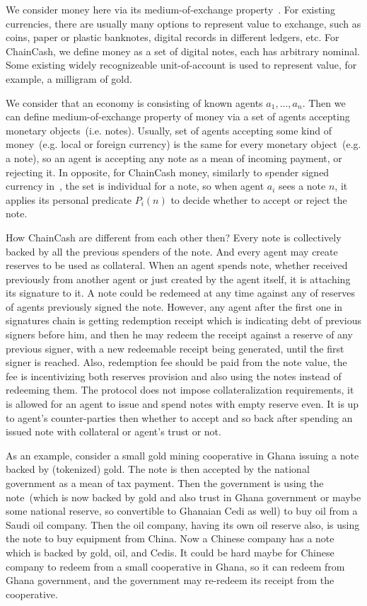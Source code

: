 \documentclass{llncs}   %
\newcommand{\cc}{ChainCash}
\begin{document}
We consider money here via its medium-of-exchange property~\cite{kiyotaki1989money}. For existing currencies, there are usually many options to represent value to exchange, such as coins, paper or plastic banknotes, digital records in different ledgers, etc. For \cc{}, we define money as a set of digital notes, each has arbitrary nominal. Some existing widely recognizeable unit-of-account is used to represent value, for example, a milligram of gold.

We consider that an economy is consisting of known agents $a_1, ..., a_n$. Then we can define medium-of-exchange property of money via a set of agents accepting monetary objects~(i.e. notes). Usually, set of agents accepting some kind of money~(e.g. local or foreign currency) is the same for every monetary object~(e.g. a note), so an agent is accepting any note as a mean of incoming payment, or rejecting it. In opposite, for \cc{} money, similarly to spender signed currency in~\cite{saito2003peer}, the set is individual for a note, so when agent $a_i$ sees a note $n$, it applies its personal predicate $P_i(n)$ to decide whether to accept or reject the note.

How \cc{} are different from each other then? Every note is collectively backed by all the previous spenders of the note. And every agent may create reserves to be used as collateral. When an agent spends note, whether received previously from another agent or just created by the agent itself, it is attaching its signature to it. A note could be redemeed at any time against any of reserves of agents previously signed the note. However, any agent after the first one in signatures chain is getting redemption receipt which is indicating debt of previous signers before him, and then he may redeem the receipt against a reserve of any previous signer, with a new redeemable receipt being generated, until the first signer is reached. Also, redemption fee should be paid from the note value, the fee is incentivizing both reserves provision and also using the notes instead of redeeming them. The protocol does not impose collateralization requirements, it is allowed for an agent to issue and spend notes with empty reserve even. It is up to agent's counter-parties then whether to accept and so back after spending an issued note with collateral or agent's trust or not.

As an example, consider a small gold mining cooperative in Ghana issuing a note backed by (tokenized) gold. The note is then accepted by the national government as a mean of tax payment. Then the government is using the note~(which is now backed by gold and also trust in Ghana government or maybe some national reserve, so convertible to Ghanaian Cedi as well) to buy oil from a Saudi oil company. Then the oil company, having its own oil reserve also, is using the note to buy equipment from China. Now a Chinese company has a note which is backed by gold, oil, and Cedis. It could be hard maybe for Chinese company to redeem from a small cooperative in Ghana, so it can redeem from Ghana government, and the government may re-redeem its receipt from the cooperative.
\end{document}
